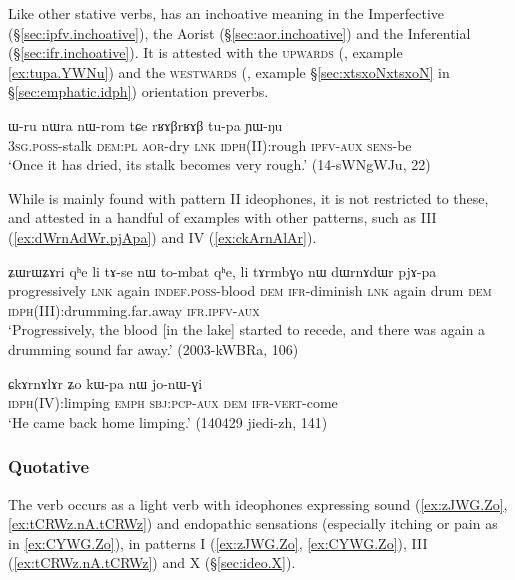 
Like other stative verbs,  has an inchoative meaning in the Imperfective (§\ref{sec:ipfv.inchoative}), the Aorist (§\ref{sec:aor.inchoative}) and the Inferential (§\ref{sec:ifr.inchoative}). It is attested with the \textsc{upwards} (, example \ref{ex:tupa.YWNu}) and the \textsc{westwards} (, example §\ref{sec:xtsxoNxtsxoN} in §\ref{sec:emphatic.idph}) orientation preverbs.


\begin{exe}
\ex \label{ex:tupa.YWNu}
\gll ɯ-ru nɯra nɯ-rom tɕe rʁɤβrʁɤβ tu-pa ɲɯ-ŋu  \\
\textsc{3sg}.\textsc{poss}-stalk \textsc{dem}:\textsc{pl} \textsc{aor}-dry \textsc{lnk} \textsc{idph}(II):rough \textsc{ipfv}-\textsc{aux} \textsc{sens}-be \\
\glt `Once it has dried, its stalk becomes very rough.' (14-sWNgWJu, 22)
\end{exe}

While  is mainly found with pattern II ideophones, it is not restricted to these, and attested in a handful of examples with other patterns, such as III (\ref{ex:dWrnAdWr.pjApa}) and IV (\ref{ex:ckArnAlAr}).

\begin{exe}
\ex \label{ex:dWrnAdWr.pjApa}
\gll ʑɯrɯʑɤri qʰe li tɤ-se nɯ to-mbat qʰe, li tɤrmbɣo nɯ dɯrnɤdɯr pjɤ-pa \\
progressively \textsc{lnk} again \textsc{indef}.\textsc{poss}-blood \textsc{dem} \textsc{ifr}-diminish \textsc{lnk} again drum \textsc{dem} \textsc{idph}(III):drumming.far.away \textsc{ifr}.\textsc{ipfv}-\textsc{aux} \\
\glt `Progressively, the blood [in the lake] started to recede, and there was again a drumming sound far away.' (2003-kWBRa, 106)
\end{exe}


\begin{exe}
\ex \label{ex:ckArnAlAr}
\gll ɕkɤrnɤlɤr ʑo kɯ-pa nɯ jo-nɯ-ɣi \\
\textsc{idph}(IV):limping \textsc{emph} \textsc{sbj}:\textsc{pcp}-\textsc{aux} \textsc{dem} \textsc{ifr}-\textsc{vert}-come \\
\glt `He came back home limping.' (140429 jiedi-zh, 141)
\end{exe}

\subsubsection{Quotative }\label{sec:idph.ti}
The verb  occurs as a light verb with ideophones expressing sound (\ref{ex:zJWG.Zo}, \ref{ex:tCRWz.nA.tCRWz}) and endopathic sensations (especially itching or pain as in \ref{ex:CYWG.Zo}), in patterns I (\ref{ex:zJWG.Zo}, \ref{ex:CYWG.Zo}), III (\ref{ex:tCRWz.nA.tCRWz}) and X (§\ref{sec:ideo.X}).

